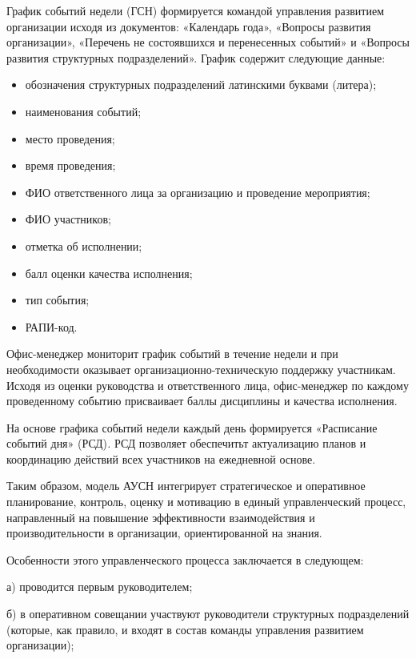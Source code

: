\begin{multicols}{2}

График событий недели (ГСН) формируется командой управления развитием
организации исходя из документов: «Календарь года», «Вопросы развития
организации», «Перечень не состоявшихся и перенесенных событий» и
«Вопросы развития структурных подразделений». График содержит следующие
данные:

\begin{itemize}
\item
  обозначения структурных подразделений латинскими буквами (литера);
\item
  наименования событий;
\item
  место проведения;
\item
  время проведения;
\item
  ФИО ответственного лица за организацию и проведение мероприятия;
\item
  ФИО участников;
\item
  отметка об исполнении;
\item
  балл оценки качества исполнения;
\item
  тип события;
\item
  РАПИ-код.
\end{itemize}

Офис-менеджер мониторит график событий в течение недели и при
необходимости оказывает организационно-техническую поддержку участникам.
Исходя из оценки руководства и ответственного лица, офис-менеджер по
каждому проведенному событию присваивает баллы дисциплины и качества
исполнения.

На основе графика событий недели каждый день формируется «Расписание
событий дня» (РСД)\emph{.} РСД позволяет обеспечитьт актуализацию планов
и координацию действий всех участников на ежедневной основе.

Таким образом, модель АУСН интегрирует стратегическое и оперативное
планирование, контроль, оценку и мотивацию в единый управленческий
процесс, направленный на повышение эффективности взаимодействия и
производительности в организации, ориентированной на знания.

Особенности этого управленческого процесса заключается в следующем:

а) проводится первым руководителем;

б) в оперативном совещании участвуют руководители структурных
подразделений (которые, как правило, и входят в состав команды
управления развитием организации);


\end{multicols}
